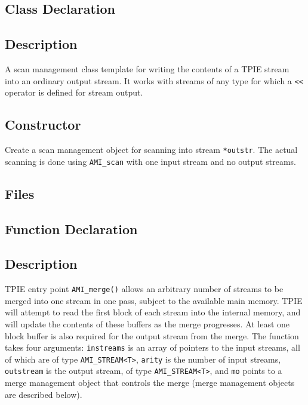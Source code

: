 \subsection{Class Declaration}
\btabb {} {}
\etabb

\subsection{Description}
A scan management class template for writing the contents of a TPIE
stream into an ordinary \CPP{} output stream.  It works with streams
of any type for which a \lstinline|<<| operator is defined for \CPP{}
stream output.

\subsection{Constructor} 
\btabb {}
{Create a scan management object for scanning into \CPP{} stream
  \lstinline|*outstr|. The actual scanning is done using
  \lstinline|AMI_scan| with one input stream and no output streams.}
\etabb




\subsection{Files}
  \btabb
     {}
  \etabb

\subsection{Function Declaration}
  \btabb
     {}
  \etabb

\subsection{Description}
TPIE entry point \lstinline|AMI_merge()| allows an arbitrary number of
streams to be merged into one stream in one pass, subject to the
available main memory.  TPIE will attempt to read the first block of each
stream into the internal memory, and will update the contents of these
buffers as the merge progresses. At least one block buffer is also
required for the output stream from the merge.  The function takes
four arguments: \lstinline|instreams| is an array of pointers to the
input streams, all of which are of type \lstinline|AMI_STREAM<T>|,
\lstinline|arity| is the number of input streams,
\lstinline|outstream| is the output stream, of type
\lstinline|AMI_STREAM<T>|, and \lstinline|mo| points to a merge
management object that controls the merge (merge management objects
are described below).

